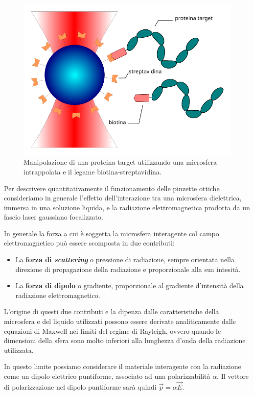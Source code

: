 \begin{figure}[ht]
    \centering
    \includegraphics[width=0.5\linewidth]{images/biotin-streptavidin.pdf}
    \caption{Manipolazione di una proteina target utilizzando una
        microsfera intrappolata e il legame biotina-streptavidina.}
    \label{fig:biotin-streptavidin}
\end{figure}

Per descrivere quantitativamente il funzionamento delle pinzette
ottiche consideriamo in generale l'effetto dell'interazione tra
una microsfera dielettrica, immersa in una soluzione liquida, e
la radiazione elettromagnetica prodotta da un fascio laser gaussiano
focalizzato.

In generale la forza a cui è soggetta la microsfera interagente
col campo elettromagnetico può essere scomposta in due contributi:

\begin{itemize}
    \item La \textbf{forza di \textit{scattering}} o pressione di
        radiazione, sempre orientata nella direzione di propagazione
        della radiazione e proporzionale alla sua intesità.
    \item La \textbf{forza di dipolo} o gradiente, proporzionale
        al gradiente d'intensità della radiazione elettromagnetico.
\end{itemize}

L'origine di questi due contributi e la dipenza dalle caratteristiche
della microsfera e del liquido utilizzati possono essere derivate
analiticamente dalle equazioni di Maxwell nei limiti del regime
di Rayleigh, ovvero quando le dimensioni della sfera sono molto
inferiori alla lunghezza d'onda della radiazione utilizzata.

In questo limite possiamo considerare il materiale interagente con la
radiazione come un dipolo elettrico puntiforme, associato ad una
polarizzabilità $\alpha$. Il vettore di polarizzazione nel dipolo
puntiforme sarà quindi $\vec{p} = \alpha \vec{E}$.

